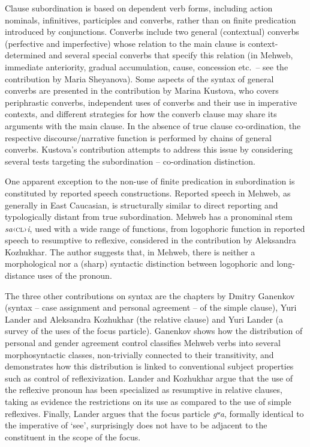 \begin{refsection}
Clause subordination is based on dependent verb forms, including action
nominals, infinitives, participles and converbs, rather than on finite
predication introduced by conjunctions. Converbs include two general (contextual)
converbs (perfective and imperfective) whose relation to the main clause
is context-determined and several special converbs that specify this relation
(in Mehweb, immediate anteriority, gradual accumulation, cause,
concession etc.~– see the contribution by Maria Sheyanova). Some
aspects of the syntax of general converbs are presented in the
contribution by Marina Kustova, who covers periphrastic converbs,
independent uses of converbs and their use in imperative contexts, and
different strategies for how the converb clause may share its arguments
with the main clause. In the absence of true clause co-ordination, the
respective discourse/narrative function is performed by chains of
general converbs. Kustova's contribution attempts to address this issue by
considering several tests targeting the subordination – co-ordination distinction.

One apparent exception to the non-use of finite predication in
subordination is constituted by reported speech constructions. Reported speech in
Mehweb, as generally in East Caucasian, is structurally similar to
direct reporting and typologically distant from true subordination.
Mehweb has a pronominal stem \emph{sa}‹\textsc{cl}›\emph{i}, used with a wide
range of functions, from logophoric function in reported speech to resumptive to
reflexive, considered in the contribution by Aleksandra Kozhukhar. The
author suggests that, in Mehweb, there is neither a morphological nor
a (sharp) syntactic distinction between logophoric and long-distance uses
of the pronoun.

The three other contributions on syntax are the chapters by Dmitry
Ganenkov (syntax – case assignment and personal agreement – of the
simple clause), Yuri Lander and Aleksandra Kozhukhar (the relative clause)
and Yuri Lander (a survey of the uses of the focus particle). Ganenkov
shows how the distribution of personal and gender agreement control
classifies Mehweb verbs into several morphosyntactic classes,
non-trivially connected to their transitivity, and demonstrates how this
distribution is linked to conventional subject properties such as
control of reflexivization. Lander and Kozhukhar argue that the use of
the reflexive pronoun has been specialized as resumptive in relative
clauses, taking as evidence the restrictions on its use as compared to
the use of simple reflexives. Finally, Lander argues that the focus
particle \emph{gʷa}, formally identical to the imperative of
`see', surprisingly does not have to be adjacent to the constituent in
the scope of the focus.


\end{refsection}
